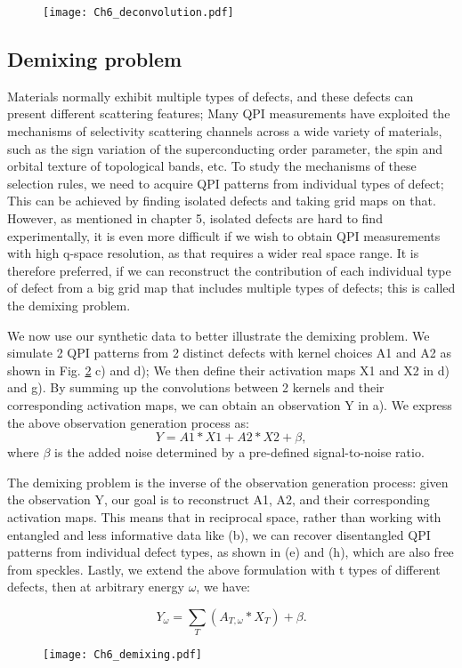 \begin{figure}
	\texttt{[image: Ch6\_deconvolution.pdf]} 
	\centering
	\caption{}
	\label{fig:ch6_decon}
\end{figure}

\subsection{Demixing problem}
Materials normally exhibit multiple types of defects, and these defects can present different scattering features; Many QPI measurements have exploited the mechanisms of selectivity scattering channels across a wide variety of materials, such as the sign variation of the superconducting order parameter, the spin and orbital texture of topological bands, etc. To study the mechanisms of these selection rules, we need to acquire \ac{QPI} patterns from individual types of defect; This can be achieved by finding isolated defects and taking grid maps on that. However, as mentioned in chapter 5, isolated defects are hard to find experimentally, it is even more difficult if we wish to obtain QPI measurements with high q-space resolution, as that requires a wider real space range. It is therefore preferred, if we can reconstruct the contribution of each individual type of defect from a big grid map that includes multiple types of defects; this is called the demixing problem.  

We now use our synthetic data to better illustrate the demixing problem. We simulate 2 \ac{QPI} patterns from 2 distinct defects with kernel choices A1 and A2 as shown in Fig. \ref{fig:ch6_demix} c) and d); We then define their activation maps X1 and X2 in d) and g). By summing up the convolutions between 2 kernels and their corresponding activation maps, we can obtain an observation Y in a). We express the above observation generation process as:
\begin{equation}
	Y = A1 * X1 + A2 * X2 + \beta, 
\end{equation}
where $\beta$ is the added noise determined by a pre-defined signal-to-noise ratio.

The demixing problem is the inverse of the observation generation process: given the observation 
Y, our goal is to reconstruct A1, A2, and their corresponding activation maps. This means that in reciprocal space, rather than working with entangled and less informative data like (b), we can recover disentangled QPI patterns from individual defect types, as shown in (e) and (h), which are also free from speckles. Lastly, we extend the above formulation with t types of different defects, then at arbitrary energy $\omega$, we have: 

\begin{equation}
	Y_{\omega} = \sum_T ( A_{T,{\omega}} * X_T) + \beta. 
\end{equation} 



\begin{figure}
	\texttt{[image: Ch6\_demixing.pdf]} 
	\centering
	\caption{}
	\label{fig:ch6_demix}
\end{figure}